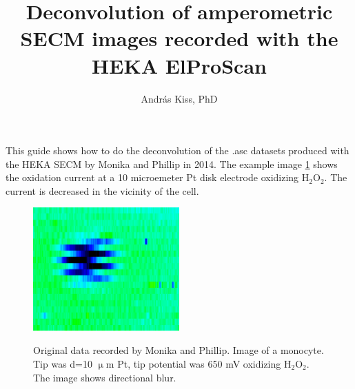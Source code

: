 \documentclass[a4paper, 11pt]{article}
\begin{document}
\title{Deconvolution of amperometric SECM images recorded with the HEKA ElProScan}
\author{András Kiss, PhD}
\maketitle

This guide shows how to do the deconvolution of the .asc datasets produced with the HEKA SECM by Monika and Phillip in 2014. The example image \ref{fig:original11} shows the oxidation current at a 10 microemeter Pt disk electrode oxidizing H$_2$O$_2$. The current is decreased in the vicinity of the cell.

\begin{figure}
\centering
\includegraphics[width=0.5\textwidth]{original11.eps}
\label{fig:original11}
\caption{Original data recorded by Monika and Phillip. Image of a monocyte. Tip was d=10 $\upmu$m Pt, tip potential was 650 mV oxidizing H$_2$O$_2$. The image shows directional blur.}
\end{figure}
\end{document}
